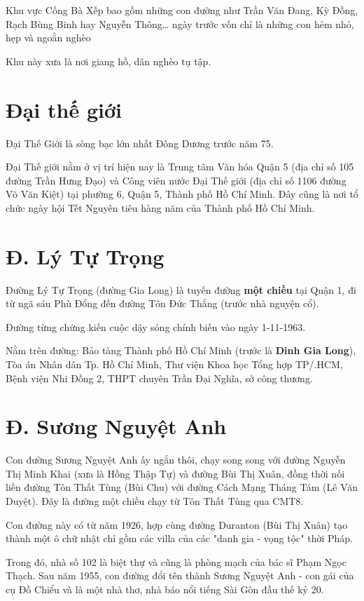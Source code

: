 Khu vực Cống Bà Xếp bao gồm những con đường như Trần Văn Đang, Kỳ Đồng, Rạch Bùng Binh hay Nguyễn Thông… ngày trước vốn chỉ là những con hẻm nhỏ, hẹp và ngoằn nghèo

Khu này xưa là nơi giang hồ, dân nghèo tụ tập.

\section{Đại thế giới}

Đại Thế Giới là sòng bạc lớn nhất Đông Dương trước năm 75.

Đại Thế giới nằm ở vị trí hiện nay là Trung tâm Văn hóa Quận 5 (địa chỉ số 105 đường Trần Hưng Đạo) và Công viên nước Đại Thế giới (địa chỉ số 1106 đường Võ Văn Kiệt) tại phường 6, Quận 5, Thành phố Hồ Chí Minh. Đây cũng là nơi tổ chức ngày hội Tết Nguyên tiêu hàng năm của Thành phố Hồ Chí Minh.

\section{Đ. Lý Tự Trọng}

Đường Lý Tự Trọng (đường Gia Long) là tuyến đường \textbf{một chiều} tại Quận 1, đi từ ngã sáu Phù Đổng đến đường Tôn Đức Thắng (trước nhà nguyện cổ).

Đường từng chứng kiến cuộc dậy sóng chính biến vào ngày 1-11-1963.

Nằm trên đường: Bảo tàng Thành phố Hồ Chí Minh (trước là \textbf{Dinh Gia Long}), Tòa án Nhân dân Tp. Hồ Chí Minh, Thư viện Khoa học Tổng hợp TP/.HCM, Bệnh viện Nhi Đồng 2, THPT chuyên Trần Đại Nghĩa, sở công thương.

\section{Đ. Sương Nguyệt Anh}

Con đường Sương Nguyệt Anh ấy ngắn thôi, chạy song song với đường Nguyễn Thị Minh Khai (xưa là Hồng Thập Tự) và đường Bùi Thị Xuân, đồng thời nối liền đường Tôn Thất Tùng (Bùi Chu) với đường Cách Mạng Tháng Tám (Lê Văn Duyệt). Đây là đường một chiều chạy từ Tôn Thất Tùng qua CMT8.

 Con đường này có từ năm 1926, hợp cùng đường Duranton (Bùi Thị Xuân) tạo thành một ô chữ nhật chỉ gồm các villa của các "danh gia - vọng tộc" thời Pháp.

Trong đó, nhà số 102 là biệt thự và cũng là phòng mạch của bác sĩ Phạm Ngọc Thạch. Sau năm 1955, con đường đổi tên thành Sương Nguyệt Anh - con gái của cụ Đồ Chiểu và là một nhà thơ, nhà báo nổi tiếng Sài Gòn đầu thế kỷ 20.

